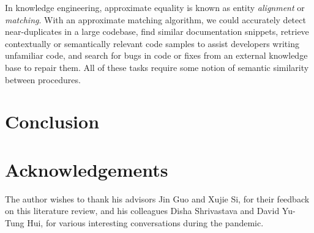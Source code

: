 \documentclass[10pt]{article}
\begin{document}
In knowledge engineering, approximate equality is known as entity \textit{alignment} or \textit{matching}. With an approximate matching algorithm, we could accurately detect near-duplicates in a large codebase, find similar documentation snippets, retrieve contextually or semantically relevant code samples to assist developers writing unfamiliar code, and search for bugs in code or fixes from an external knowledge base to repair them. All of these tasks require some notion of semantic similarity between procedures.

  \section{Conclusion}

  \pagebreak \section{Acknowledgements}

The author wishes to thank his advisors Jin Guo and Xujie Si, for their feedback on this literature review, and his colleagues Disha Shrivastava and David Yu-Tung Hui, for various interesting conversations during the pandemic.

  
  
\end{document}
